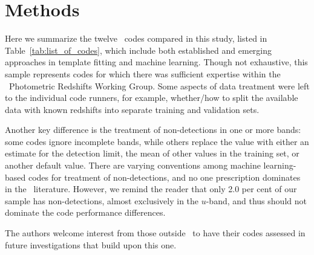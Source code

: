 \section{Methods}
\label{sec:pzcodes}

Here we summarize the twelve \pzpdf\ codes compared in this study, listed in Table~\ref{tab:list_of_codes}, which include both established and emerging approaches in template fitting and machine learning.
Though not exhaustive, this sample represents codes for which there was sufficient expertise within the \lsstdesc\ Photometric Redshifts Working Group.
Some aspects of data treatment were left to the individual code runners, for example, whether/how to split the available data with known redshifts into separate training and validation sets.

Another key difference is the treatment of non-detections in one or more bands: some codes ignore incomplete bands, while others replace the value with either an estimate for the detection limit, the mean of other values in the training set, or another default value.
There are varying conventions among machine learning-based codes for treatment of non-detections, and no one prescription dominates in the \pz\ literature.
However, we remind the reader that only 2.0 per cent of our sample has non-detections, almost exclusively in the $u$-band, and thus should not dominate the code performance differences.

The authors welcome interest from those outside \lsstdesc\ to have their codes assessed in future investigations that build upon this one.

